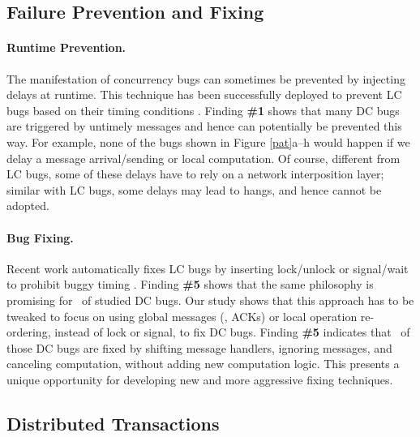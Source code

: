 \vten %

\subsection{Failure Prevention and Fixing}
\label{less-runtime}


\paragraph{Runtime Prevention.}

The manifestation of 
concurrency bugs can sometimes be prevented by
injecting delays at runtime.  This technique has been successfully
deployed to prevent LC bugs based on their timing
conditions \cite{DeadlockImmunity, avisio,conair.asplos13}.
%
%
Finding {\bf \#1} shows that many DC bugs are triggered by untimely
messages and hence can potentially be prevented this way.  For
example, none of the bugs shown in Figure \ref{pat}a--h would happen
if we delay a message arrival/sending or local computation.  Of
course, different from LC bugs, some of these delays have to rely on a
network interposition layer; similar with LC bugs, some
delays may lead to hangs, and hence cannot be adopted.



\paragraph{Bug Fixing.}

Recent work automatically fixes LC bugs by inserting lock/unlock or
signal/wait to prohibit buggy timing \cite{cfix.osdi12,
  grail.fse14, wang.osdi08}.
%
%
Finding {\bf \#5} shows that the same philosophy is promising for
\pctFixTime\ of studied DC bugs. Our study 
shows that this approach has to be tweaked to focus on using global
messages (\eg, ACKs) or local operation re-ordering, instead of lock
or signal, to fix DC bugs.  Finding {\bf \#5} indicates that
\pctFixHandEasy\ of those DC bugs are fixed by shifting message handlers,
ignoring messages, and canceling computation, without adding new
computation logic.  This presents a unique opportunity for developing
new and more aggressive fixing techniques.


\vfive  %

\subsection{Distributed Transactions}
\label{less-tx}

